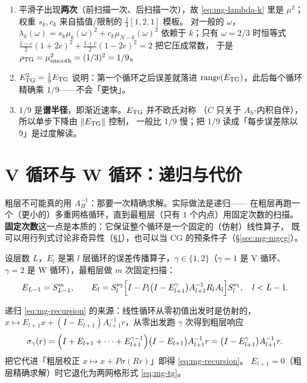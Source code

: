 \begin{remark}
\begin{enumerate}
  \item 平滑子出现\textbf{两次}（前扫描一次、后扫描一次），故 \eqref{eq:mg-lambda-k} 里是 $\mu^2$；
        权重 $s_k,c_k$ 来自插值/限制的 $\frac14[1,2,1]$ 模板。
        对一般的 $\omega$，$\lambda_k(\omega)=s_k\mu_k(\omega)^2+c_k\mu_{N-k}(\omega)^2$
        依赖于 $k$；只有 $\omega=2/3$ 时恒等式
        $\frac{1-c}{2}(1+2c)^2+\frac{1+c}{2}(1-2c)^2=2$ 把它压成常数，
        于是 $\rho_{\rm TG}=\mu_{\rm smooth}^2=(1/3)^2=1/9$。
  \item $E_{\rm TG}^2=\frac19E_{\rm TG}$ 说明：第一个循环之后误差就落进
        $\operatorname{range}(E_{\rm TG})$，此后每个循环精确乘 $1/9$——不会「更快」。
  \item $1/9$ 是\textbf{谱半径}，即渐近速率。$E_{\rm TG}$ 并不欧氏对称
        （$C$ 只关于 $A_h$-内积自伴），所以单步下降由 $\|E_{\rm TG}\|$ 控制，
        一般比 $1/9$ 慢；把 $1/9$ 读成「每步误差除以 9」是过度解读。
\end{enumerate}
\end{remark}

\section{V 循环与 W 循环：递归与代价}
\label{sec:mg-cycle}

粗层不可能真的用 $A_H^{-1}$：那要一次精确求解。实际做法是递归——
在粗层再跑一个（更小的）多重网格循环，直到最粗层（只有 $1$ 个内点）用固定次数的扫描。
\textbf{固定次数}这一点是本质的：它保证整个循环是一个固定的（仿射）线性算子，
既可以用行列式讨论非奇异性（\S\ref{sec:mg-cycle}），也可以当 CG 的预条件子（\S\ref{sec:mg-mgcg}）。

\begin{definition}[V/W 循环的递归]
\label{def:mg-cycle}
设层数 $L$，$E_l$ 是第 $l$ 层循环的误差传播算子，$\gamma\in\{1,2\}$（$\gamma=1$ 是 V 循环、
$\gamma=2$ 是 W 循环），最粗层做 $m$ 次固定扫描：
\begin{equation}
  E_{L-1}=S_{L-1}^{m},
  \qquad
  E_l=S_l^{\nu_2}\Bigl[I-P_l\bigl(I-E_{l+1}^{\gamma}\bigr)A_{l+1}^{-1}R_lA_l\Bigr]S_l^{\nu_1},
  \quad l<L-1 .
  \label{eq:mg-recursion}
\end{equation}
\end{definition}

递归 \eqref{eq:mg-recursion} 的来源：线性循环从零初值出发时是仿射的，
$x\mapsto E_{l+1}x+(I-E_{l+1})A_{l+1}^{-1}r$，从零出发跑 $\gamma$ 次得到粗层响应
\begin{equation}
  \sigma_\gamma(r)=\Bigl(I+E_{l+1}+\cdots+E_{l+1}^{\gamma-1}\Bigr)\bigl(I-E_{l+1}\bigr)A_{l+1}^{-1}r
  =\bigl(I-E_{l+1}^{\gamma}\bigr)A_{l+1}^{-1}r .
  \label{eq:mg-coarse-response}
\end{equation}
把它代进「粗层校正 $x\mapsto x+P\sigma(Rr)$」即得 \eqref{eq:mg-recursion}。
$E_{l+1}=0$（粗层精确求解）时它退化为两网格形式 \eqref{eq:mg-tg}。

